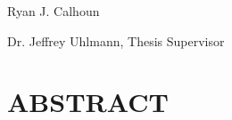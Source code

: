 \documentclass[12pt,letterpaper]{report}
\begin{document}
\thispagestyle{empty}
\smalltitle
\vspace{20pt}
\begin{center}
Ryan J. Calhoun
\end{center}

\vspace{10pt}
\begin{center}
Dr. Jeffrey Uhlmann, Thesis Supervisor 
\end{center}
\vspace{5pt}
\section*{\centering ABSTRACT}
\vspace{40pt}


\thispagestyle{empty}
\end{document}
